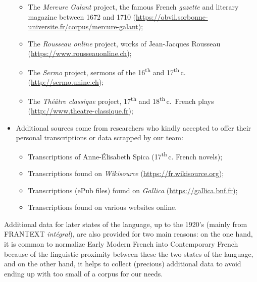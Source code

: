 \begin{itemize}
\begin{itemize}
              \item The \emph{Mercure Galant} project, the famous French \emph{gazette} and literary magazine between 1672 and 1710 (\url{https://obvil.sorbonne-universite.fr/corpus/mercure-galant});
              \item The \emph{Rousseau online} project, works of Jean-Jacques Rousseau (\url{https://www.rousseauonline.ch});
              \item The \emph{Sermo} project, sermons of the 16\textsuperscript{th} and 17\textsuperscript{th}\,c. (\url{http://sermo.unine.ch});
              \item The \emph{Théâtre classique} project, 17\textsuperscript{th} and 18\textsuperscript{th}\,c.~French plays (\url{http://www.theatre-classique.fr});
          \end{itemize}
    \item Additional sources come from researchers who kindly accepted to offer their personal transcriptions or data scrapped by our team:
          \begin{itemize}
              \item Transcriptions of Anne-Élisabeth Spica (17\textsuperscript{th}\,c. French novels);
              \item Transcriptions found on \emph{Wikisource} (\url{https://fr.wikisource.org});
              \item Transcriptions (ePub files) found on \emph{Gallica} (\url{https://gallica.bnf.fr});
              \item Transcriptions found on various websites online.
          \end{itemize}
\end{itemize}

Additional data for later states of the language, up to the 1920's (mainly from FRANTEXT \emph{intégral}), are also provided for two main reasons: on the one hand, it is common to normalize Early Modern French into Contemporary French \citep{gabay-2014-pourquoi} because of the linguistic proximity between these the two states of the language, and on the other hand, it helps to collect (precious) additional data to avoid ending up with too small of a corpus for our needs.

